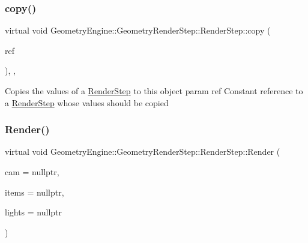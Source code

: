 \subsubsection{\texorpdfstring{copy()}{copy()}}
{\footnotesize\ttfamily virtual void Geometry\+Engine\+::\+Geometry\+Render\+Step\+::\+Render\+Step\+::copy (\begin{DoxyParamCaption}\item[{const \mbox{\hyperlink{class_geometry_engine_1_1_geometry_render_step_1_1_render_step}{Render\+Step}} \&}]{ref }\end{DoxyParamCaption})\hspace{0.3cm}{\ttfamily [inline]}, {\ttfamily [protected]}, {\ttfamily [virtual]}}

Copies the values of a \mbox{\hyperlink{class_geometry_engine_1_1_geometry_render_step_1_1_render_step}{Render\+Step}} to this object param ref Constant reference to a \mbox{\hyperlink{class_geometry_engine_1_1_geometry_render_step_1_1_render_step}{Render\+Step}} whose values should be copied \mbox{\label{class_geometry_engine_1_1_geometry_render_step_1_1_render_step_a9b054ee8f38304319a9d03ba3e173dcd}} 
\subsubsection{\texorpdfstring{Render()}{Render()}}
{\footnotesize\ttfamily virtual void Geometry\+Engine\+::\+Geometry\+Render\+Step\+::\+Render\+Step\+::\+Render (\begin{DoxyParamCaption}\item[{\mbox{\hyperlink{class_geometry_engine_1_1_geometry_world_item_1_1_geometry_camera_1_1_camera}{Geometry\+World\+Item\+::\+Geometry\+Camera\+::\+Camera}} $\ast$}]{cam = {\ttfamily nullptr},  }\item[{std\+::unordered\+\_\+set$<$ \mbox{\hyperlink{class_geometry_engine_1_1_geometry_world_item_1_1_geometry_item_1_1_geometry_item}{Geometry\+World\+Item\+::\+Geometry\+Item\+::\+Geometry\+Item}} $\ast$ $>$ $\ast$}]{items = {\ttfamily nullptr},  }\item[{std\+::unordered\+\_\+set$<$ \mbox{\hyperlink{class_geometry_engine_1_1_geometry_world_item_1_1_geometry_light_1_1_light}{Geometry\+World\+Item\+::\+Geometry\+Light\+::\+Light}} $\ast$ $>$ $\ast$}]{lights = {\ttfamily nullptr} }\end{DoxyParamCaption})\hspace{0.3cm}{\ttfamily [pure virtual]}}

